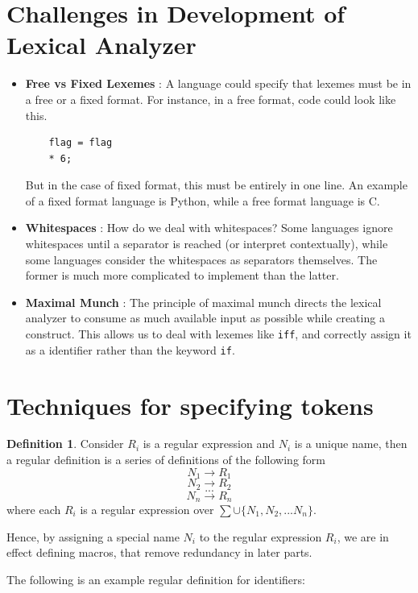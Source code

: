 \documentclass[12pt,letterpaper]{book}
\theoremstyle{definition}
\newtheorem{definition}{Definition}[section] %
\begin{document}
\section{Challenges in Development of Lexical Analyzer}

\begin{itemize}
  \item \textbf{Free vs Fixed Lexemes} : A language could specify that lexemes must be in a free or a fixed format. For instance, in a free format, code could look like this.
    \begin{verbatim}
    flag = flag
    * 6;
    \end{verbatim}
    But in the case of fixed format, this must be entirely in one line. An example of a fixed format language is Python, while a free format language is C.
  \item \textbf{Whitespaces} : How do we deal with whitespaces? Some languages ignore whitespaces until a separator is reached (or interpret contextually), while some languages consider the whitespaces as separators themselves. The former is much more complicated to implement than the latter.
  \item \textbf{Maximal Munch} : The principle of maximal munch directs the lexical analyzer to consume as much available input as possible while creating a construct. This allows us to deal with lexemes like \texttt{iff}, and correctly assign it as a identifier rather than the keyword \texttt{if}.
\end{itemize}

\section{Techniques for specifying tokens} 

\begin{definition}
  Consider $R_i$ is a regular expression and $N_i$ is a unique name, then a regular definition is a series of definitions of the following form 
  \[N_1 \rightarrow R_1 \]
  \[N_2 \rightarrow R_2 \]
  \[...\]
  \[N_n \rightarrow R_n \]
  where each $R_i$ is a regular expression over $\sum \cup \{N_1,N_2,...N_n\}$.
\end{definition}

Hence, by assigning a special name $N_i$ to the regular expression $R_i$, we are in effect defining macros, that remove redundancy in later parts.

The following is an example regular definition for identifiers:
\end{document}
